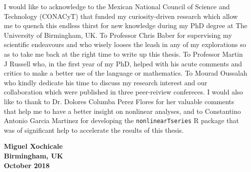 
\begin{acknowledgements}      
I would like to acknowledge to the Mexican National Council of Science and 
Technology (CONACyT) that funded my curiosity-driven research which 
allow me to quench this endless thirst for new knowledge during my 
PhD degree at The University of Birmingham, UK.
To Professor Chris Baber for supervising my scientific endeavours
and who wisely looses the leash in any of my explorations 
so as to take me back at the right time to write up this thesis.
To Professor Martin J Russell who, in the first year 
of my PhD, helped with his acute comments and critics to make a
better use of the language or mathematics.
To Mourad Oussalah who kindly dedicate his time to discuss 
my research interest and our collaboration which were published 
in three peer-reiview confereces.
I would also like to thank to Dr. Dolores Columba Perez Flores for
her valuable comments that help me to have a better insight on
nonlinear analyses, and to Constantino Antonio Garcia Martinez 
for developing the \texttt{nonlinearTseries} R package that was of 
significant help to accelerate the results of this thesis.

\begin{flushright}
\textbf{Miguel Xochicale}\\
\textbf{Birmingham, UK}\\
\textbf{October 2018}
\end{flushright}

\end{acknowledgements}

